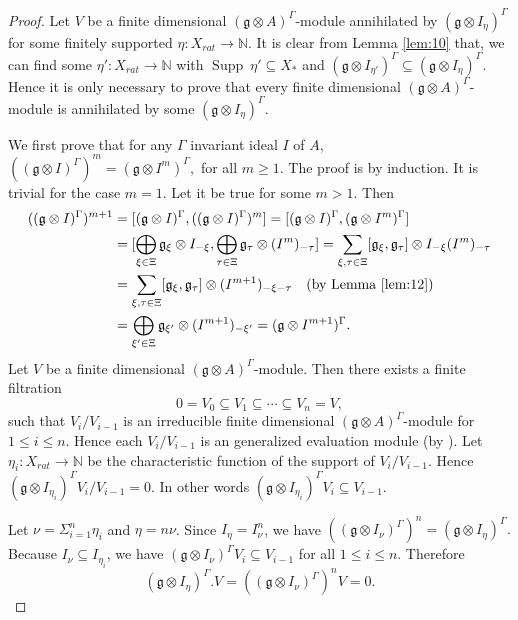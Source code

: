 \documentclass[11pt]{amsart}
\theoremstyle{plain}
\theoremstyle{definition}
\newcommand{\g}{\mathfrak{g}}
\DeclareMathOperator{\Supp}{Supp}
\begin{document}
\begin{proof}
Let $V$ be a finite dimensional $(\g\otimes A)^{\Gamma}$-module annihilated by $(\g\otimes I_{\eta})^{\Gamma}$ for some finitely supported $\eta:X_{rat}\rightarrow\mathbb{N}$. It is clear from Lemma \ref{lem:10} that, we can find some $\eta':X_{rat}\rightarrow\mathbb{N}$ with $\Supp~\eta'\subseteq X_{*}$ and $(\g\otimes I_{\eta'})^{\Gamma}\subseteq(\g\otimes I_{\eta})^{\Gamma}$. Hence it is only necessary to prove that every finite dimensional $(\g\otimes A)^{\Gamma}$-module is annihilated by some $(\g\otimes I_{\eta})^{\Gamma}$.
   
We first prove that for any $\Gamma$ invariant ideal $I$ of $A$, $((\g\otimes I)^{\Gamma})^{m}=(\g\otimes I^{m})^{\Gamma},$ for all $m\geq 1.$
The proof is by induction. It is trivial for the case $m=1$. Let it be true for some $m>1$. Then 
\begin{align*}
        ((\g\otimes I)^{\Gamma})^{m+1}&=[(\g\otimes I)^{\Gamma},((\g\otimes I)^{\Gamma})^{m}]
        =[(\g\otimes I)^{\Gamma},(\g\otimes I^{m})^{\Gamma}]\\
       &=[\bigoplus_{\xi\in\Xi}\g_{\xi}\otimes I_{-\xi},\bigoplus_{\tau\in\Xi}\g_{\tau}\otimes (I^{m})_{-\tau}]=\sum
       _{\xi,\tau\in\Xi}[\g_{\xi},\g_{\tau}]\otimes I_{-\xi}(I^{m})_{-\tau}\\
       &=\sum_{\xi,\tau\in\Xi}[\g_{\xi},\g_{\tau}]\otimes (I^{m+1})_{-\xi-\tau}\quad \mbox{(by Lemma \ref{lem:12})}\\
       &=\bigoplus_{\xi'\in\Xi}\g_{\xi'}\otimes(I^{m+1})_{-\xi'}=(\g\otimes I^{m+1})^{\Gamma}.
    \end{align*}
Let $V$ be a finite dimensional $(\g\otimes A)^{\Gamma}$-module. Then there exists a finite  filtration 
    \begin{equation*}
        0=V_{0}\subseteq V_{1}\subseteq\cdots\subseteq V_{n}=V,
    \end{equation*}
such that $V_{i}/V_{i-1}$ is an irreducible finite dimensional $(\g\otimes A)^{\Gamma}$-module for $1\leq i\leq n$. Hence each $V_{i}/V_{i-1}$ is an generalized evaluation module (by \cite[Corollary 8.7 ]{Sav14}). Let $\eta_{i}:X_{rat}\rightarrow\mathbb{N}$ be the characteristic function of the support of $V_{i}/V_{i-1}$. Hence $(\g\otimes I_{\eta_{i}})^{\Gamma} V_{i}/V_{i-1}=0$. In other words $(\g\otimes I_{\eta_{i}})^{\Gamma}V_{i}\subseteq V_{i-1}$.

Let $\nu=\Sigma_{i=1}^{n}\eta_{i}$ and $\eta=n\nu$. Since $I_{\eta}=I_{\nu}^{n}$, we have $((\g\otimes I_{\nu})^{\Gamma})^{n}=(\g\otimes I_{\eta})^{\Gamma}.$ Because $I_{\nu}\subseteq I_{\eta_{i}}$, we have $(\g\otimes I_{\nu})^{\Gamma}V_{i}\subseteq V_{i-1}$ for all $1\leq i\leq n$. Therefore
    \begin{equation*}
        (\g\otimes I_{\eta})^{\Gamma}.V=((\g\otimes I_{\nu})^{\Gamma})^{n}V=0.
    \end{equation*}
\end{proof}
\end{document}
